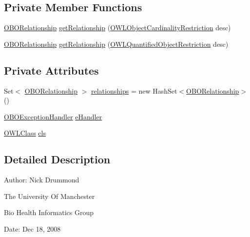 \subsection*{Private Member Functions}
\begin{DoxyCompactItemize}
\item 
\hyperlink{classorg_1_1coode_1_1owlapi_1_1obo_1_1renderer_1_1_o_b_o_relationship}{O\-B\-O\-Relationship} \hyperlink{classorg_1_1coode_1_1owlapi_1_1obo_1_1renderer_1_1_o_b_o_relationship_generator_aca7a114b8ecd569f5d0e2ad36a878322}{get\-Relationship} (\hyperlink{interfaceorg_1_1semanticweb_1_1owlapi_1_1model_1_1_o_w_l_object_cardinality_restriction}{O\-W\-L\-Object\-Cardinality\-Restriction} desc)
\item 
\hyperlink{classorg_1_1coode_1_1owlapi_1_1obo_1_1renderer_1_1_o_b_o_relationship}{O\-B\-O\-Relationship} \hyperlink{classorg_1_1coode_1_1owlapi_1_1obo_1_1renderer_1_1_o_b_o_relationship_generator_add8fb45804948724599ca1b85a0405b5}{get\-Relationship} (\hyperlink{interfaceorg_1_1semanticweb_1_1owlapi_1_1model_1_1_o_w_l_quantified_object_restriction}{O\-W\-L\-Quantified\-Object\-Restriction} desc)
\end{DoxyCompactItemize}
\subsection*{Private Attributes}
\begin{DoxyCompactItemize}
\item 
Set$<$ \hyperlink{classorg_1_1coode_1_1owlapi_1_1obo_1_1renderer_1_1_o_b_o_relationship}{O\-B\-O\-Relationship} $>$ \hyperlink{classorg_1_1coode_1_1owlapi_1_1obo_1_1renderer_1_1_o_b_o_relationship_generator_abd2130e546da71fba334a4efb65b334c}{relationships} = new Hash\-Set$<$\hyperlink{classorg_1_1coode_1_1owlapi_1_1obo_1_1renderer_1_1_o_b_o_relationship}{O\-B\-O\-Relationship}$>$()
\item 
\hyperlink{interfaceorg_1_1coode_1_1owlapi_1_1obo_1_1renderer_1_1_o_b_o_exception_handler}{O\-B\-O\-Exception\-Handler} \hyperlink{classorg_1_1coode_1_1owlapi_1_1obo_1_1renderer_1_1_o_b_o_relationship_generator_a5ba69cac5aec6a8a16c0c0ebe84f1754}{e\-Handler}
\item 
\hyperlink{interfaceorg_1_1semanticweb_1_1owlapi_1_1model_1_1_o_w_l_class}{O\-W\-L\-Class} \hyperlink{classorg_1_1coode_1_1owlapi_1_1obo_1_1renderer_1_1_o_b_o_relationship_generator_af95cf4894559f0361dfd054eca7bcee3}{cls}
\end{DoxyCompactItemize}


\subsection{Detailed Description}
Author\-: Nick Drummond\par
 The University Of Manchester\par
 Bio Health Informatics Group\par
 Date\-: Dec 18, 2008\par
\par
 


